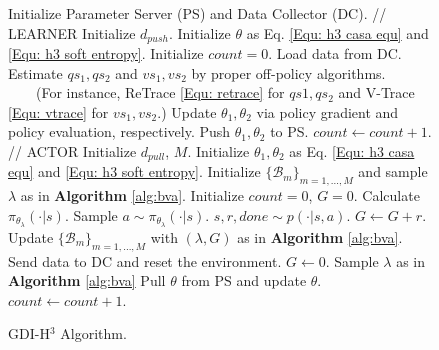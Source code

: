 \begin{figure}[ht]
  \centering
  \begin{minipage}{.7\linewidth}
    \begin{algorithm}[H]
      \caption{GDI-H$^3$ Algorithm.}  
          \begin{algorithmic}
            \STATE Initialize Parameter Server (PS) and Data Collector (DC).
            \STATE
            \STATE // LEARNER
            \STATE Initialize $d_{push}$.
            \STATE Initialize $\theta$  as Eq. \eqref{Equ: h3 casa equ} and \eqref{Equ: h3 soft entropy}.
            \STATE Initialize $count = 0$.
                \STATE Load data from DC.
                \STATE Estimate $qs_1, qs_2$ and $vs_1, vs_2$ by proper off-policy algorithms.
                \STATE \ \ \ \ (For instance, ReTrace \eqref{Equ: retrace} for $qs1, qs_2$ and V-Trace \eqref{Equ: vtrace} for $vs_1, vs_2$.)
                \STATE Update $\theta_1, \theta_2$ via policy gradient and policy evaluation, respectively.
                    \STATE Push $\theta_1, \theta_2$ to PS.
                \ENDIF
                \STATE $count \leftarrow count + 1$.
            \ENDWHILE
            \STATE
            \STATE // ACTOR
            \STATE Initialize $d_{pull}$, $M$.
            \STATE Initialize $\theta_1, \theta_2$ as Eq. \eqref{Equ: h3 casa equ} and \eqref{Equ: h3 soft entropy}.
            \STATE Initialize $\{\mathcal{B}_m\}_{m=1,...,M}$ and sample $\lambda$ as in \textbf{Algorithm} \ref{alg:bva}.
            \STATE Initialize $count = 0$, $G = 0$.
                \STATE Calculate $\pi_{\theta_{\lambda}}(\cdot | s)$.
                \STATE Sample $a \sim \pi_{\theta_{\lambda}}(\cdot | s)$.
                \STATE $s, r, done \sim p(\cdot | s, a)$.
                \STATE $G \leftarrow G + r$.
                    \STATE Update $\{\mathcal{B}_m\}_{m=1,...,M}$ with $(\lambda, G)$ as in \textbf{Algorithm} \ref{alg:bva}.
                    \STATE Send data to DC and reset the environment.
                    \STATE $G \leftarrow 0$.
                    \STATE Sample $\lambda$ as in \textbf{Algorithm} \ref{alg:bva}
                \ENDIF
                    \STATE Pull $\theta$ from PS and update $\theta$.
                \ENDIF
                \STATE $count \leftarrow count + 1$.
            \ENDWHILE
          \end{algorithmic}
        \label{alg:h3}
    \end{algorithm}
  \end{minipage}
\end{figure}

